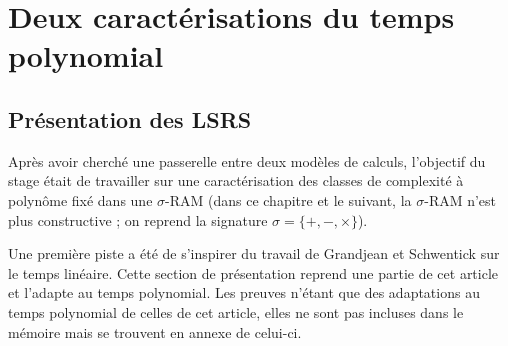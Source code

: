 %
%
%
%
%
%



\newcommand{\dtimeram}{\text{DTIME}_{\text{RAM}}\left( n^K \right)}
\newcommand{\dtimeramarg}[1]{\text{DTIME}_{\text{RAM}}\left( n^{#1} \right)}
\newcommand{\eqpred}[3]{#1\left[ #2^{\leftarrow}(#3) \right]_{#3}}
\newcommand{\eqpredf}[4]{#1\left[ #2^{\leftarrow}(#3) \right]_{#4}} %
\newcommand{\eqpredfi}[5]{#1\left[ #2^{\leftarrow}(#3) #4 \right]_{#5}} %
\newcommand{\arite}[1]{\text{arité}\left( #1 \right)}
\newcommand{\leqa}{\left( \leqslant a \right)}
\newcommand{\rang}[1]{\text{rang}\left( #1 \right)}

%
%	
%	
%	
	\pagebreak 
	

	 
	\pagebreak
		
	\chapter{Deux caractérisations du temps polynomial}
	\label{chap:rLSRS}
	
	\section{Présentation des LSRS}
	
	Après avoir cherché une passerelle entre deux modèles de calculs, l'objectif du stage était de travailler sur une caractérisation des classes de complexité à polynôme fixé dans une $\sigma$-RAM (dans ce chapitre et le suivant, la $\sigma$-RAM n'est plus constructive ; on reprend la signature $\sigma = \{+,-,\times \}$). 
	
	Une première piste a été de s'inspirer du travail de Grandjean et Schwentick \cite{GrandjeanSchwentick2002} sur le temps linéaire. Cette section de présentation reprend une partie de cet article et l'adapte au temps polynomial. Les preuves n'étant que des adaptations au temps polynomial de celles de cet article, elles ne sont pas incluses dans le mémoire mais se trouvent en annexe de celui-ci.
		
